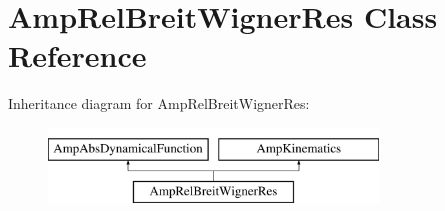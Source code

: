 \hypertarget{class_amp_rel_breit_wigner_res}{\section{Amp\-Rel\-Breit\-Wigner\-Res Class Reference}
\label{class_amp_rel_breit_wigner_res}
}
Inheritance diagram for Amp\-Rel\-Breit\-Wigner\-Res\-:\begin{figure}[H]
\begin{center}
\leavevmode
\includegraphics[height=2.000000cm]{class_amp_rel_breit_wigner_res}
\end{center}
\end{figure}
